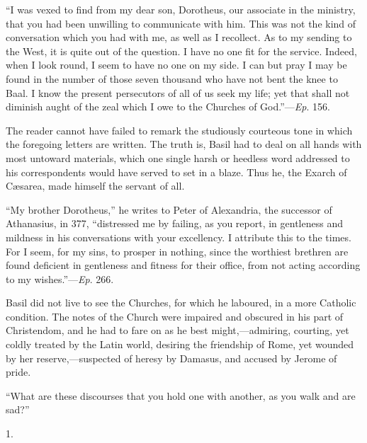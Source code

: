 ``I was vexed to find from my dear son, Dorotheus, our
associate in the ministry, that you had been unwilling to communicate
with him. This was not the kind of conversation which you had with me,
as well as I recollect. As to my sending to the West, it is quite out
of the question. I have no one fit for the service. Indeed, when I
look round, I seem to have no one on my side. I can but pray I may be
found in the number of those seven thousand who have not bent the knee
to Baal. I know the present persecutors of all of us seek my life; yet
that shall not diminish aught of the zeal which I owe to the Churches
of God.''—\emph{Ep}. 156.

The reader cannot have failed to remark the studiously courteous
tone in which the foregoing letters are written. The truth is, Basil
had to deal on all hands with most untoward materials, which one
single harsh or heedless word addressed to his correspondents would
have served to set in a blaze. Thus he, the Exarch of Cæsarea, made
himself the servant of all.

``My brother Dorotheus,'' he writes to Peter of Alexandria,
the successor of Athanasius, in 377, ``distressed me by failing,
as you report, in gentleness and mildness in his conversations with
your excellency. I attribute this to the times. For I seem, for my
sins, to prosper in nothing, since the worthiest brethren are found
deficient in gentleness and fitness for their office, from not acting
according to my wishes.''—\emph{Ep}. 266.

Basil did not live to see the Churches, for which he laboured, in a
more Catholic condition. The notes of the Church were impaired and
obscured in his part of Christendom, and he had to fare on as he best
might,—admiring, courting, yet coldly treated by the Latin world,
desiring the friendship of Rome, yet wounded by her reserve,—suspected
of heresy by Damasus, and accused by Jerome of pride.


``What are these discourses that you hold one with
another, as you walk and are sad?''

1.

